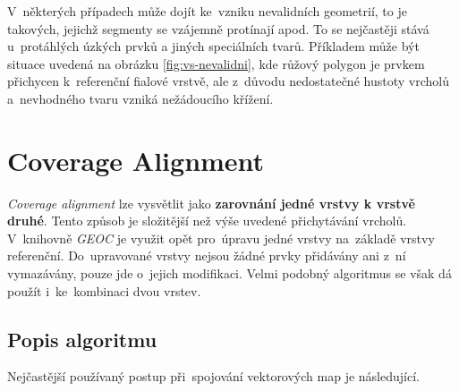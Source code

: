 V~některých případech může dojít ke~vzniku nevalidních geometrií, to je takových, jejichž segmenty se vzájemně protínají apod. To se nejčastěji stává u~protáhlých úzkých prvků
a jiných speciálních tvarů. Příkladem může být situace uvedená na obrázku \ref{fig:vs-nevalidni}, kde růžový polygon je prvkem přichycen k~referenční fialové vrstvě, ale 
z~důvodu nedostatečné hustoty vrcholů a~nevhodného tvaru vzniká nežádoucího křížení. 







\section{Coverage Alignment} 
\label{coverage alignment}

\textit{Coverage alignment} lze vysvětlit jako \textbf{zarovnání jedné vrstvy k vrstvě druhé}. Tento způsob je složitější než výše uvedené přichytávání vrcholů.
V~knihovně \textit{GEOC} je využit opět pro~úpravu jedné vrstvy na~základě vrstvy referenční. Do~upravované vrstvy nejsou žádné prvky přidávány ani z~ní vymazávány,
pouze jde o~jejich modifikaci. Velmi podobný algoritmus se však dá použít i~ke~kombinaci dvou vrstev. 

\subsection{Popis algoritmu}
\label{ca-algoritmus}

Nejčastější používaný postup při~spojování vektorových map je následující.

